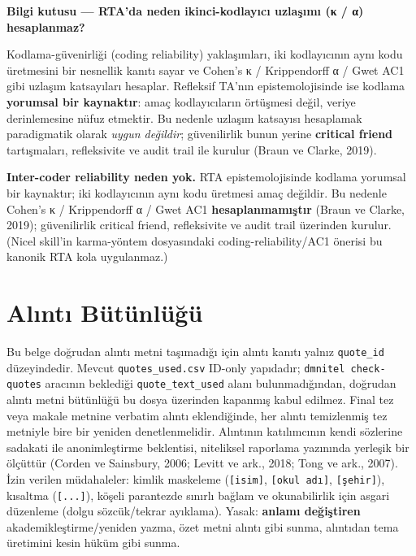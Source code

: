 \documentclass[
  turkish,
  a4paper,
  DIV=11,
  numbers=noendperiod]{scrreprt}
\begin{document}
\begin{tcolorbox}[enhanced jigsaw, arc=.35mm, bottomrule=.15mm, bottomtitle=1mm, breakable, colback=white, colbacktitle=quarto-callout-note-color!10!white, colframe=quarto-callout-note-color-frame, coltitle=black, left=2mm, leftrule=.75mm, opacityback=0, opacitybacktitle=0.6, rightrule=.15mm, title=\textcolor{quarto-callout-note-color}{\faInfo}\hspace{0.5em}{Not}, titlerule=0mm, toprule=.15mm, toptitle=1mm]

\textbf{Bilgi kutusu --- RTA'da neden ikinci-kodlayıcı uzlaşımı (κ / α)
hesaplanmaz?}

Kodlama-güvenirliği (coding reliability) yaklaşımları, iki kodlayıcının
aynı kodu üretmesini bir nesnellik kanıtı sayar ve Cohen's κ /
Krippendorff α / Gwet AC1 gibi uzlaşım katsayıları hesaplar. Refleksif
TA'nın epistemolojisinde ise kodlama \textbf{yorumsal bir kaynaktır}:
amaç kodlayıcıların örtüşmesi değil, veriye derinlemesine nüfuz
etmektir. Bu nedenle uzlaşım katsayısı hesaplamak paradigmatik olarak
\emph{uygun değildir}; güvenilirlik bunun yerine \textbf{critical
friend} tartışmaları, refleksivite ve audit trail ile kurulur (Braun ve
Clarke, 2019).

\end{tcolorbox}

\textbf{Inter-coder reliability neden yok.} RTA epistemolojisinde
kodlama yorumsal bir kaynaktır; iki kodlayıcının aynı kodu üretmesi amaç
değildir. Bu nedenle Cohen's κ / Krippendorff α / Gwet AC1
\textbf{hesaplanmamıştır} (Braun ve Clarke, 2019); güvenilirlik critical
friend, refleksivite ve audit trail üzerinden kurulur. (Nicel skill'in
karma-yöntem dosyasındaki coding-reliability/AC1 önerisi bu kanonik RTA
kola uygulanmaz.)

\section{Alıntı
Bütünlüğü}\label{alux131ntux131-buxfctuxfcnluxfcux11fuxfc}

Bu belge doğrudan alıntı metni taşımadığı için alıntı kanıtı yalnız
\texttt{quote\_id} düzeyindedir. Mevcut \texttt{quotes\_used.csv}
ID-only yapıdadır; \texttt{dmnitel\ check-quotes} aracının beklediği
\texttt{quote\_text\_used} alanı bulunmadığından, doğrudan alıntı metni
bütünlüğü bu dosya üzerinden kapanmış kabul edilmez. Final tez veya
makale metnine verbatim alıntı eklendiğinde, her alıntı temizlenmiş tez
metniyle bire bir yeniden denetlenmelidir. Alıntının katılımcının kendi
sözlerine sadakati ile anonimleştirme beklentisi, niteliksel raporlama
yazınında yerleşik bir ölçüttür (Corden ve Sainsbury, 2006; Levitt ve
ark., 2018; Tong ve ark., 2007). İzin verilen müdahaleler: kimlik
maskeleme (\texttt{{[}isim{]}}, \texttt{{[}okul\ adı{]}},
\texttt{{[}şehir{]}}), kısaltma (\texttt{{[}...{]}}), köşeli parantezde
sınırlı bağlam ve okunabilirlik için asgari düzenleme (dolgu
sözcük/tekrar ayıklama). Yasak: \textbf{anlamı değiştiren}
akademikleştirme/yeniden yazma, özet metni alıntı gibi sunma, alıntıdan
tema üretimini kesin hüküm gibi sunma.
\end{document}
